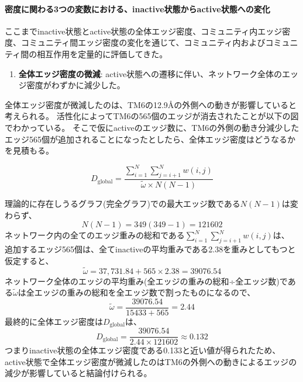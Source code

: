 \paragraph{密度に関わる3つの変数における、inactive状態からactive状態への変化}

ここまでinactive状態とactive状態の全体エッジ密度、コミュニティ内エッジ密度、コミュニティ間エッジ密度の変化を通じて、コミュニティ内およびコミュニティ間の相互作用を定量的に評価してきた。
\begin{enumerate}
  \item \textbf{全体エッジ密度の微減}: active状態への遷移に伴い、ネットワーク全体のエッジ密度がわずかに減少した。
\end{enumerate}

全体エッジ密度が微減したのは、TM6の12.9Åの外側への動きが影響していると考えられる。
活性化によってTM6の565個のエッジが消去されたことが以下の図でわかっている。
そこで仮にactiveのエッジ数に、TM6の外側の動き分減少したエッジ565個が追加されることになったとしたら、全体エッジ密度はどうなるかを見積もる。

\begin{equation}
  D_{\text{global}} = \frac{\sum_{i=1}^{N} \sum_{j=i+1}^{N} w(i, j)}{\tilde{\omega} \times N(N-1)}
\end{equation}

理論的に存在しうるグラフ(完全グラフ)での最大エッジ数である$N(N-1)$は変わらず、
\begin{equation}
  N(N-1) = 349(349-1) = 121602
\end{equation}
ネットワーク内の全てのエッジ重みの総和である$\sum_{i=1}^{N} \sum_{j=i+1}^{N} w(i, j)$は、
追加するエッジ565個は、全てinactiveの平均重みである2.38を重みとしてもつと仮定すると、
\begin{equation}
  \tilde{\omega} = 37,731.84+565 \times 2.38 = 39076.54
\end{equation}
ネットワーク全体のエッジの平均重み(全エッジの重みの総和÷全エッジ数)である$\tilde{\omega}$は全エッジの重みの総和を全エッジ数で割ったものになるので、
\begin{equation}
  \tilde{\omega} = \frac{39076.54}{15433+565} = 2.44
\end{equation}
最終的に全体エッジ密度は$D_{\text{global}}$は、
\begin{equation}
  D_{\text{global}} = \frac{39076.54}{2.44 \times 121602} \approx 0.132
\end{equation}
つまりinactive状態の全体エッジ密度である0.133と近い値が得られたため、
active状態で全体エッジ密度が微減したのはTM6の外側への動きによるエッジの減少が影響していると結論付けられる。


